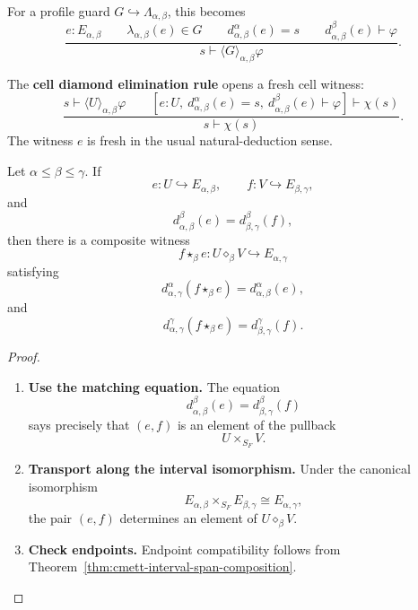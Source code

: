 For a profile guard \(G\hookrightarrow\Lambda_{\alpha,\beta}\), this becomes
\[
        \frac{
        e:E_{\alpha,\beta}
        \qquad
        \lambda_{\alpha,\beta}(e)\in G
        \qquad
        d_{\alpha,\beta}^{\alpha}(e)=s
        \qquad
        d_{\alpha,\beta}^{\beta}(e)\vdash\varphi
        }{
        s\vdash\langle G\rangle_{\alpha,\beta}\varphi
        }.
\]

\begin{definition}
\label{def:cmett-cell-diamond-elimination}
    The \textbf{cell diamond elimination rule} opens a fresh cell witness:
    \[
        \frac{
        s\vdash\langle U\rangle_{\alpha,\beta}\varphi
        \qquad
        \left[
        e:U,\ 
        d_{\alpha,\beta}^{\alpha}(e)=s,\ 
        d_{\alpha,\beta}^{\beta}(e)\vdash\varphi
        \right]\vdash\chi(s)
        }{
        s\vdash\chi(s)
        }.
    \]
    The witness \(e\) is fresh in the usual natural-deduction sense.
\end{definition}

\begin{proposition}
\label{prop:cmett-witness-composition-rule}
    Let \(\alpha\leq\beta\leq\gamma\). If
    \[
        e:U\hookrightarrow E_{\alpha,\beta},
        \qquad
        f:V\hookrightarrow E_{\beta,\gamma},
    \]
    and
    \[
        d_{\alpha,\beta}^{\beta}(e)=d_{\beta,\gamma}^{\beta}(f),
    \]
    then there is a composite witness
    \[
        f\star_\beta e:U\diamond_\beta V
        \hookrightarrow E_{\alpha,\gamma}
    \]
    satisfying
    \[
        d_{\alpha,\gamma}^{\alpha}(f\star_\beta e)
        =
        d_{\alpha,\beta}^{\alpha}(e),
    \]
    and
    \[
        d_{\alpha,\gamma}^{\gamma}(f\star_\beta e)
        =
        d_{\beta,\gamma}^{\gamma}(f).
    \]
\end{proposition}

\begin{proof}
    \leavevmode
    \begin{enumerate}
        \item \textbf{Use the matching equation.}
        The equation
        \[
            d_{\alpha,\beta}^{\beta}(e)=d_{\beta,\gamma}^{\beta}(f)
        \]
        says precisely that \((e,f)\) is an element of the pullback
        \[
            U\times_{S_F}V.
        \]

        \item \textbf{Transport along the interval isomorphism.}
        Under the canonical isomorphism
        \[
            E_{\alpha,\beta}\times_{S_F}E_{\beta,\gamma}
            \cong
            E_{\alpha,\gamma},
        \]
        the pair \((e,f)\) determines an element of
        \(U\diamond_\beta V\).

        \item \textbf{Check endpoints.}
        Endpoint compatibility follows from
        Theorem~\ref{thm:cmett-interval-span-composition}.
    \end{enumerate}
\end{proof}

